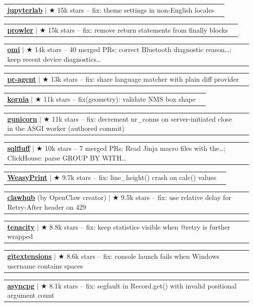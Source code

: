 \documentclass[letterpaper,11pt]{article}
\makeatletter
\newcommand{\resumeProjectHeading}[2]{
    \item
    \begin{tabular*}{0.97\textwidth}{l@{\extracolsep{\fill}}r}
      \small#1 & \hspace{8pt}\small#2 \\
    \end{tabular*}\vspace{-11.4pt}
}
\makeatother
\begin{document}
      \resumeProjectHeading{\textbf{\href{https://github.com/jupyterlab/jupyterlab/pull/18530}{jupyterlab}} $|$ {\small $\bigstar$ 15k stars} \textnormal{ -- fix: theme settings in non-English locales}}{}
      \resumeProjectHeading{\textbf{\href{https://github.com/prowler-cloud/prowler/pull/10102}{prowler}} $|$ {\small $\bigstar$ 15k stars} \textnormal{ -- fix: remove return statements from finally blocks}}{}
      \resumeProjectHeading{\textbf{\href{https://github.com/BasedHardware/omi/pulls?q=is\%3Apr\%20is\%3Amerged\%20author\%3Aapoorvdarshan}{omi}} $|$ {\small $\bigstar$ 14k stars} \textnormal{ -- 40 merged PRs: correct Bluetooth diagnostic reason…; keep recent device diagnostics…}}{}
      \resumeProjectHeading{\textbf{\href{https://github.com/The-PR-Agent/pr-agent/pull/2895}{pr-agent}} $|$ {\small $\bigstar$ 13k stars} \textnormal{ -- fix: share language matcher with plain diff provider}}{}
      \resumeProjectHeading{\textbf{\href{https://github.com/kornia/kornia/pull/4121}{kornia}} $|$ {\small $\bigstar$ 11k stars} \textnormal{ -- fix(geometry): validate NMS box shape}}{}
      \resumeProjectHeading{\textbf{\href{https://github.com/benoitc/gunicorn/pull/3686}{gunicorn}} $|$ {\small $\bigstar$ 11k stars} \textnormal{ -- fix: decrement nr\_conns on server-initiated close in the ASGI worker (authored commit)}}{}
      \resumeProjectHeading{\textbf{\href{https://github.com/sqlfluff/sqlfluff/pulls?q=is\%3Apr\%20is\%3Amerged\%20author\%3Aapoorvdarshan}{sqlfluff}} $|$ {\small $\bigstar$ 10k stars} \textnormal{ -- 7 merged PRs: Read Jinja macro files with the…; ClickHouse: parse GROUP BY WITH…}}{}
      \resumeProjectHeading{\textbf{\href{https://github.com/Kozea/WeasyPrint/pull/2831}{WeasyPrint}} $|$ {\small $\bigstar$ 9.7k stars} \textnormal{ -- fix: line\_height() crash on calc() values}}{}
      \resumeProjectHeading{\textbf{\href{https://github.com/openclaw/clawhub/pull/421}{clawhub}} \textnormal{(by OpenClaw creator)} $|$ {\small $\bigstar$ 9.5k stars} \textnormal{ -- fix: use relative delay for Retry-After header on 429}}{}
      \resumeProjectHeading{\textbf{\href{https://github.com/jd/tenacity/pull/653}{tenacity}} $|$ {\small $\bigstar$ 8.8k stars} \textnormal{ -- fix: keep statistics visible when @retry is further wrapped}}{}
      \resumeProjectHeading{\textbf{\href{https://github.com/gitextensions/gitextensions/pull/12841}{gitextensions}} $|$ {\small $\bigstar$ 8.6k stars} \textnormal{ -- fix: console launch fails when Windows username contains spaces}}{}
      \resumeProjectHeading{\textbf{\href{https://github.com/MagicStack/asyncpg/pull/1333}{asyncpg}} $|$ {\small $\bigstar$ 8.1k stars} \textnormal{ -- fix: segfault in Record.get() with invalid positional argument count}}{}
\end{document}
